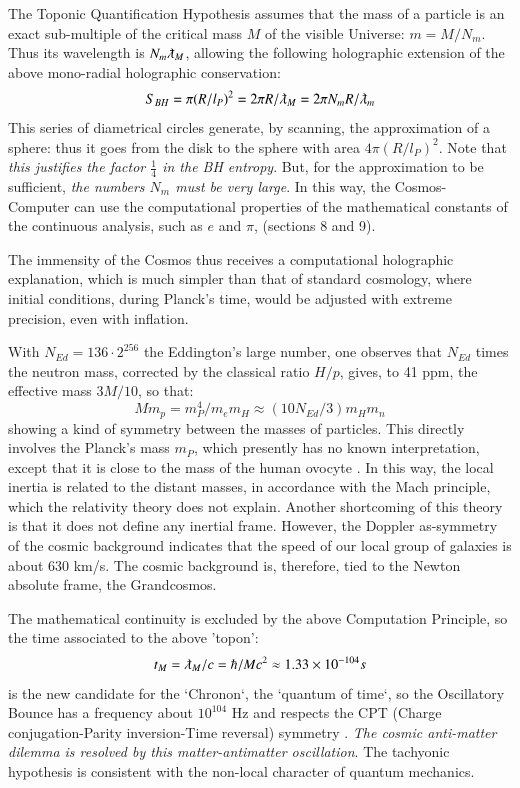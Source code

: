 \documentclass[twoside,draft]{article}
\begin{document}
\begin{sloppypar}
The Toponic Quantification Hypothesis assumes that the mass of a particle is an exact sub-multiple 
of the critical  mass $M$ of the visible Universe: $m = M/N_{m}$. Thus its wavelength is 
$N_m \lambdabar_{M}$, allowing the following holographic extension of the above mono-radial holographic conservation:
\begin{equation}
S_{BH} = \pi(R/l_{P})^{2} = 2\pi R/\lambdabar_{M} = 2\pi N_{m} R/\lambdabar_{m}
\end{equation}
This series of diametrical circles generate, by scanning, the approximation of a sphere: thus it goes 
from the disk to the sphere with area $4\pi(R/l_{P})^{2}$. Note that \textit{this justifies the factor $\frac{1}{4}$ in the BH entropy}. 
But, for the approximation to be sufficient, \textit{the numbers $N_{m}$ must be very large}. In this way, the Cosmos-
Computer can use the computational properties of the mathematical constants of the continuous analysis, such as $e$ and $\pi$, (sections 8 and 9).

The immensity of the Cosmos thus receives a computational holographic explanation, which is much simpler than that of standard cosmology, where initial conditions, during Planck's time, would be adjusted with extreme precision, even with inflation. 

With $N_{Ed} = 136 \cdot2^{256}$ the Eddington's large number, one observes that $N_{Ed}$ times the neutron mass, corrected by the classical ratio $H/p$, gives, to 41 ppm, the effective mass $3M/10$, so that:
\begin{equation}
Mm_p = m_P^4/m_em_H\approx(10N_{Ed}/3)m_Hm_n 
\end{equation}
showing a kind of symmetry between the masses of particles. This directly involves the Planck's mass $m_{P}$, which presently has no known interpretation, except that it is close to the mass of the human ovocyte \cite{Sanchez1}. In this way, the local inertia is related to the distant masses, in accordance with the Mach principle, which the relativity theory does not explain. Another shortcoming of this theory is that it does not define any inertial frame. However, the Doppler as-symmetry of the cosmic background indicates that the speed of our local group of galaxies is about 630 km/s. The cosmic background is, therefore, tied to the Newton absolute frame, the Grandcosmos.

The mathematical continuity is excluded by the above Computation Principle, so the time associated to the above 'topon': 
\begin{equation}
t_M = \lambdabar_{M} /c = \hbar/Mc^2 \approx 1.33 \times 10^{-104}s 
\end{equation}
is the new candidate for the `Chronon`, the `quantum of time`, so the Oscillatory Bounce has a frequency about $10^{104}$ Hz  \cite{Sanchez2} and respects the CPT (Charge conjugation-Parity inversion-Time reversal) symmetry \cite{Sanchez1}. \textit{The cosmic anti-matter dilemma is resolved by this matter-antimatter oscillation}. The tachyonic hypothesis is consistent with the non-local character of quantum mechanics.


\end{sloppypar}
\end{document}
